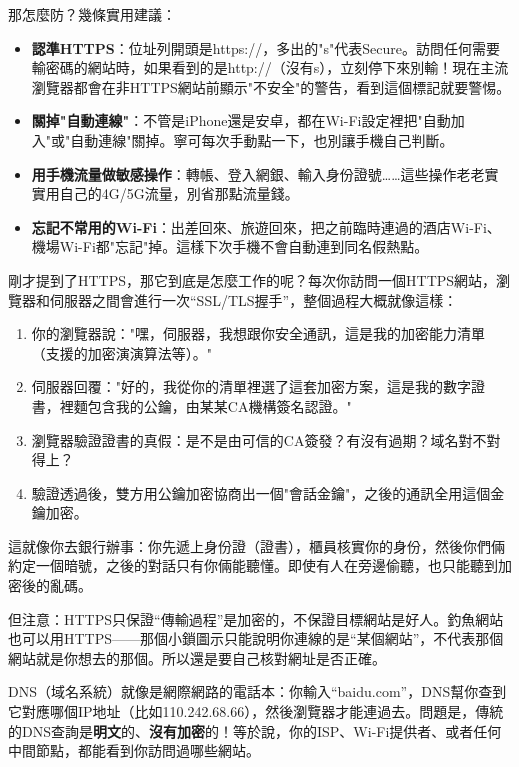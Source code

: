 那怎麼防？幾條實用建議：

\begin{itemize}
  \item \textbf{認準HTTPS}：位址列開頭是https://，多出的"s"代表Secure。訪問任何需要輸密碼的網站時，如果看到的是http://（沒有s），立刻停下來別輸！現在主流瀏覽器都會在非HTTPS網站前顯示"不安全"的警告，看到這個標記就要警惕。
  \item \textbf{關掉"自動連線"}：不管是iPhone還是安卓，都在Wi-Fi設定裡把"自動加入"或"自動連線"關掉。寧可每次手動點一下，也別讓手機自己判斷。
  \item \textbf{用手機流量做敏感操作}：轉帳、登入網銀、輸入身份證號……這些操作老老實實用自己的4G/5G流量，別省那點流量錢。
  \item \textbf{忘記不常用的Wi-Fi}：出差回來、旅遊回來，把之前臨時連過的酒店Wi-Fi、機場Wi-Fi都"忘記"掉。這樣下次手機不會自動連到同名假熱點。
\end{itemize}


剛才提到了HTTPS，那它到底是怎麼工作的呢？每次你訪問一個HTTPS網站，瀏覽器和伺服器之間會進行一次“SSL/TLS握手”，整個過程大概就像這樣：

\begin{enumerate}
  \item 你的瀏覽器說："嘿，伺服器，我想跟你安全通訊，這是我的加密能力清單（支援的加密演演算法等）。"
  \item 伺服器回覆："好的，我從你的清單裡選了這套加密方案，這是我的數字證書，裡麵包含我的公鑰，由某某CA機構簽名認證。"
  \item 瀏覽器驗證證書的真假：是不是由可信的CA簽發？有沒有過期？域名對不對得上？
  \item 驗證透過後，雙方用公鑰加密協商出一個"會話金鑰"，之後的通訊全用這個金鑰加密。
\end{enumerate}

這就像你去銀行辦事：你先遞上身份證（證書），櫃員核實你的身份，然後你們倆約定一個暗號，之後的對話只有你倆能聽懂。即使有人在旁邊偷聽，也只能聽到加密後的亂碼。

但注意：HTTPS只保證“傳輸過程”是加密的，不保證目標網站是好人。釣魚網站也可以用HTTPS——那個小鎖圖示只能說明你連線的是“某個網站”，不代表那個網站就是你想去的那個。所以還是要自己核對網址是否正確。


DNS（域名系統）就像是網際網路的電話本：你輸入“baidu.com”，DNS幫你查到它對應哪個IP地址（比如110.242.68.66），然後瀏覽器才能連過去。問題是，傳統的DNS查詢是\textbf{明文}的、\textbf{沒有加密}的！等於說，你的ISP、Wi-Fi提供者、或者任何中間節點，都能看到你訪問過哪些網站。

